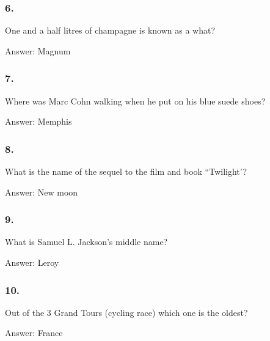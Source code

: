 \documentclass{beamer}
\begin{document}
    \begin{frame}
        \frametitle{6.}
        One and a half litres of champagne is known as a what?\\

        \begin{center}
            Answer: Magnum
        \end{center}
    \end{frame}

    \begin{frame}
        \frametitle{7.}
        Where was Marc Cohn walking when he put on his blue suede shoes?\\

        \begin{center}
            Answer: Memphis
        \end{center}
    \end{frame}

    \begin{frame}
        \frametitle{8.}
        What is the name of the sequel to the film and book ``Twilight'?\\

        \begin{center}
            Answer: New moon
        \end{center}
    \end{frame}

    \begin{frame}
        \frametitle{9.}
        What is Samuel L. Jackson's middle name?\\

        \begin{center}
            Answer: Leroy
        \end{center}
    \end{frame}

    \begin{frame}
        \frametitle{10.}
        Out of the 3 Grand Tours (cycling race) which one is the oldest?\\

        \begin{center}
            Answer: France
        \end{center}
    \end{frame}
\end{document}
